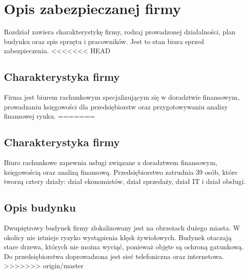 \newpage\section{Opis zabezpieczanej firmy}
Rozdział zawiera charakterystykę firmy, rodzaj prowadzonej działalności, plan budynku oraz spis sprzętu i pracowników. Jest to stan biura sprzed zabezpieczenia.
<<<<<<< HEAD

\subsection{Charakterystyka firmy}
Firma jest biurem rachunkowym specjalizującym się w doradztwie finansowym, prowadzaniu księgowości dla przedsiębiorstw oraz przygotowywaniu analizy finansowej rynku. 
=======
\subsection{Charakterystyka firmy}
Biuro rachunkowe zapewnia usługi związane z doradztwem finansowym, księgowością oraz analizą finansową. Przedsiębiorstwo zatrudnia 39 osób, które tworzą cztery działy: dział ekonomistów, dział sprzedaży, dział IT i dział obsługi.

\subsection{Opis budynku}
Dwupiętrowy budynek firmy zlokalizowany jest na obrzeżach dużego miasta. W okolicy nie istnieje ryzyko wystąpienia klęsk żywiołowych. Budynek otaczają stare drzewa, których nie można wyciąć, ponieważ objęte są ochroną gatunkową. Do przedsiębiorstwa doprowadzona jest sieć telefoniczna oraz internetowa.
>>>>>>> origin/master
